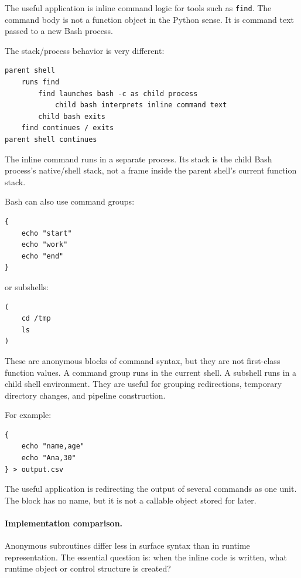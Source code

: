 The useful application is inline command logic for tools such as \texttt{find}. The command body is not a function object in the Python sense. It is command text passed to a new Bash process.

The stack/process behavior is very different:

\begin{verbatim}
parent shell
    runs find
        find launches bash -c as child process
            child bash interprets inline command text
        child bash exits
    find continues / exits
parent shell continues
\end{verbatim}

The inline command runs in a separate process. Its stack is the child Bash process's native/shell stack, not a frame inside the parent shell's current function stack.

Bash can also use command groups:

\begin{verbatim}
{
    echo "start"
    echo "work"
    echo "end"
}
\end{verbatim}

or subshells:

\begin{verbatim}
(
    cd /tmp
    ls
)
\end{verbatim}

These are anonymous blocks of command syntax, but they are not first-class function values. A command group runs in the current shell. A subshell runs in a child shell environment. They are useful for grouping redirections, temporary directory changes, and pipeline construction.

For example:

\begin{verbatim}
{
    echo "name,age"
    echo "Ana,30"
} > output.csv
\end{verbatim}

The useful application is redirecting the output of several commands as one unit. The block has no name, but it is not a callable object stored for later.

\paragraph{Implementation comparison.}

Anonymous subroutines differ less in surface syntax than in runtime representation. The essential question is: when the inline code is written, what runtime object or control structure is created?

